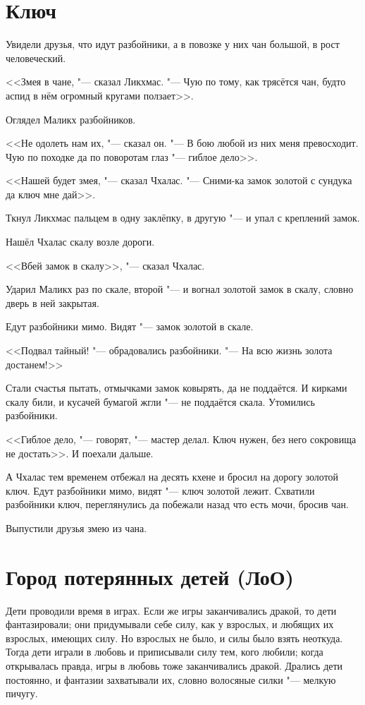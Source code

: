 \section{Ключ}

Увидели друзья, что идут разбойники, а в повозке у них чан большой, в рост человеческий.

<<Змея в чане, "--- сказал Ликхмас.
"--- Чую по тому, как трясётся чан, будто аспид в нём огромный кругами ползает>>.

Оглядел Маликх разбойников.

<<Не одолеть нам их, "--- сказал он.
"--- В бою любой из них меня превосходит.
Чую по походке да по поворотам глаз "--- гиблое дело>>.

<<Нашей будет змея, "--- сказал Чхалас.
"--- Сними-ка замок золотой с сундука да ключ мне дай>>.

Ткнул Ликхмас пальцем в одну заклёпку, в другую "--- и упал с креплений замок.

Нашёл Чхалас скалу возле дороги.

<<Вбей замок в скалу>>, "--- сказал Чхалас.

Ударил Маликх раз по скале, второй "--- и вогнал золотой замок в скалу, словно дверь в ней закрытая.

Едут разбойники мимо.
Видят "--- замок золотой в скале.

<<Подвал тайный! "--- обрадовались разбойники.
"--- На всю жизнь золота достанем!>>

Стали счастья пытать, отмычками замок ковырять, да не поддаётся.
И кирками скалу били, и кусачей бумагой жгли "--- не поддаётся скала.
Утомились разбойники.

<<Гиблое дело, "--- говорят, "--- мастер делал.
Ключ нужен, без него сокровища не достать>>.
И поехали дальше.

А Чхалас тем временем отбежал на десять кхене и бросил на дорогу золотой ключ.
Едут разбойники мимо, видят "--- ключ золотой лежит.
Схватили разбойники ключ, переглянулись да побежали назад что есть мочи, бросив чан.

Выпустили друзья змею из чана.

\section{Город потерянных детей (ЛоО)}

Дети проводили время в играх.
Если же игры заканчивались дракой, то дети фантазировали;
они придумывали себе силу, как у взрослых, и любящих их взрослых, имеющих силу.
Но взрослых не было, и силы было взять неоткуда.
Тогда дети играли в любовь и приписывали силу тем, кого любили;
когда открывалась правда, игры в любовь тоже заканчивались дракой.
Дрались дети постоянно, и фантазии захватывали их, словно волосяные силки "--- мелкую пичугу\footnotemark.

